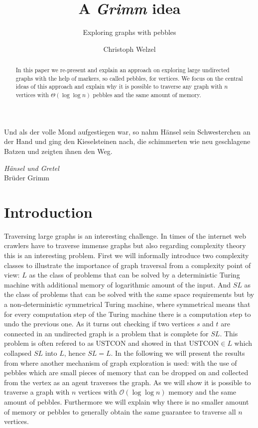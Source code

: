\documentclass[draft,oneside]{scrartcl}
\begin{document}


\setlength{\epigraphwidth}{0.7\textwidth}

\title{A \emph{Grimm} idea}
\subtitle{Exploring graphs with pebbles}
\author{Christoph Welzel}
\maketitle

\begin{abstract}
  In this paper we re-present and explain an approach on exploring large
  undirected graphs with the help of markers, so called pebbles, for vertices.
  We focus on the central ideas of this approach and explain why it is possible
  to traverse any graph with $n$ vertices with $\Theta(\log \log n)$ pebbles
  and the same amount of memory.
\end{abstract}

\epigraph{Und als der volle Mond aufgestiegen war, so nahm Hänsel sein %
Schwesterchen an der Hand und ging den Kieselsteinen nach, die schimmerten %
wie neu geschlagene Batzen und zeigten ihnen den Weg.}%
{\emph{Hänsel und Gretel}\\Brüder Grimm}

\section{Introduction}
Traversing large graphs is an interesting challenge. In times of the internet
web crawlers have to traverse immense graphs but also regarding complexity
theory this is an interesting problem. First we will informally introduce two
complexity classes to illustrate the importance of graph traversal from a
complexity point of view: $L$ as the class of problems that can be solved by
a deterministic Turing machine with additional memory of logarithmic amount
of the input. And $SL$ as the class of problems that can be solved with the
same space requirements but by a non-deterministic symmetrical Turing machine,
where symmetrical means that for every computation step of the Turing machine
there is a computation step to undo the previous one. As it turns out checking
if two vertices $s$ and $t$ are connected in an undirected graph is a problem
that is complete for $SL$. This problem is often refered to as
$\mathrm{USTCON}$ and \citeauthor{logspacealg} showed in \cite{logspacealg}
that $\mathrm{USTCON}\in L$ which collapsed $SL$ into $L$, hence $SL = L$.
In the following we will present the results from \cite{pebbles} where another
mechanism of graph exploration is used: with the use of pebbles which are small
pieces of memory that can be dropped on and collected from the vertex as an
agent traverses the graph. As we will show it is possible to traverse a graph
with $n$ vertices with $\mathcal{O}(\log\log n)$ memory and the same amount of
pebbles. Furthermore we will explain why there is no smaller amount of memory
or pebbles to generally obtain the same guarantee to traverse all $n$ vertices.
\end{document}
